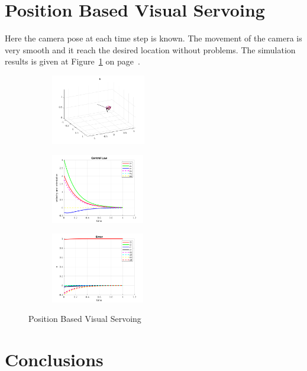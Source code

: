 \documentclass[a4paper,12pt]{article}
\begin{document}
\section{Position Based Visual Servoing}
Here the camera pose at each time step is known. The movement of the camera is very smooth and it reach the desired location without problems. The simulation results is given at Figure~\ref{fig:pbvs} on page~\pageref{fig:pbvs}.
\begin{figure}[tb]
         \begin{subfigure}[b]{0.32\textwidth}
        	\centering
	        \includegraphics[height=1.2in]{../results/PBVS3.png}
		 \end{subfigure}
         \begin{subfigure}[b]{0.2\textwidth}
        	\centering
	        \includegraphics[height=1.2in]{../results/PBVS2.png}
		 \end{subfigure}%
         \begin{subfigure}[b]{0.32\textwidth}
        	\centering
	        \includegraphics[height=1.2in]{../results/PBVS1.png}
		 \end{subfigure}%
         \caption{Position Based Visual Servoing} 
 	\label{fig:pbvs} 
\end{figure}

\section{Conclusions}
\end{document}
